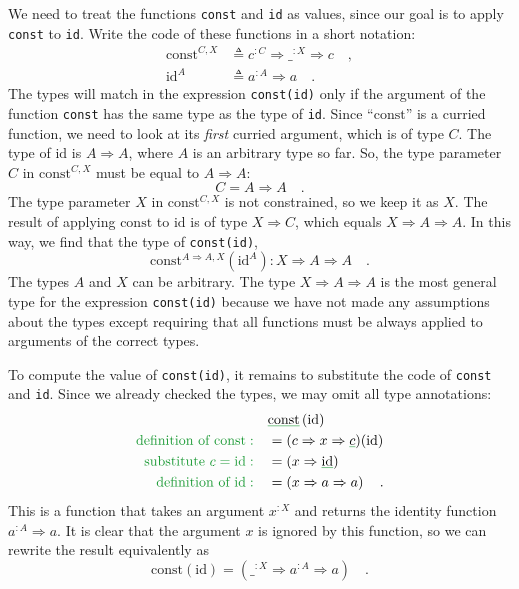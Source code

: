 We need to treat the functions \lstinline!const!
and \lstinline!id! as values,
since our goal is to apply \lstinline!const!
to \lstinline!id!. Write
the code of these functions in a short notation:
\begin{align*}
\text{const}^{C,X} & \triangleq c^{:C}\Rightarrow\_^{:X}\Rightarrow c\quad,\\
\text{id}^{A} & \triangleq a^{:A}\Rightarrow a\quad.
\end{align*}
The types will match in the expression \lstinline!const(id)!
only if the argument of the function \lstinline!const!
has the same type as the type of \lstinline!id!.
Since ``$\text{const}$'' is a curried function, we need to look
at its \emph{first} curried argument, which is of type $C$. The type
of $\text{id}$ is $A\Rightarrow A$, where $A$ is an arbitrary type
so far. So, the type parameter $C$ in $\text{const}^{C,X}$ must
be equal to $A\Rightarrow A$:
\[
C=A\Rightarrow A\quad.
\]
 The type parameter $X$ in $\text{const}^{C,X}$ is not constrained,
so we keep it as $X$. The result of applying $\text{const}$ to $\text{id}$
is of type $X\Rightarrow C$, which equals $X\Rightarrow A\Rightarrow A$.
In this way, we find that the type of \lstinline!const(id)!,
\[
\text{const}^{A\Rightarrow A,X}(\text{id}^{A}):X\Rightarrow A\Rightarrow A\quad.
\]
The types $A$ and $X$ can be arbitrary. The type $X\Rightarrow A\Rightarrow A$
is the most general type for the expression \lstinline!const(id)!
because we have not made any assumptions about the types except requiring
that all functions must be always applied to arguments of the correct
types.

To compute the value of \lstinline!const(id)!,
it remains to substitute the code of \lstinline!const!
and \lstinline!id!. Since
we already checked the types, we may omit all type annotations:
\begin{align*}
 & \gunderline{\text{const}}\left(\text{id}\right)\\
{\color{greenunder}\text{definition of const}:}\quad & =(c\Rightarrow x\Rightarrow\gunderline c)(\text{id})\\
{\color{greenunder}\text{substitute }c=\text{id}:}\quad & =(x\Rightarrow\gunderline{\text{id}})\\
{\color{greenunder}\text{definition of }\text{id}:}\quad & =\left(x\Rightarrow a\Rightarrow a\right)\quad.
\end{align*}
This is a function that takes an argument $x^{:X}$ and returns the
identity function $a^{:A}\Rightarrow a$. It is clear that the argument
$x$ is ignored by this function, so we can rewrite the result equivalently
as
\[
\text{const}(\text{id})=(\_^{:X}\Rightarrow a^{:A}\Rightarrow a)\quad.
\]


